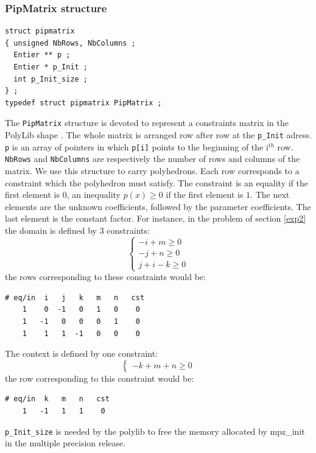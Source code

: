 \documentclass[12pt,a4paper]{article}
\begin{document}
\subsubsection{PipMatrix structure}
\begin{verbatim}
struct pipmatrix
{ unsigned NbRows, NbColumns ;
  Entier ** p ;
  Entier * p_Init ;
  int p_Init_size ;
} ;
typedef struct pipmatrix PipMatrix ;
\end{verbatim}
The {\tt PipMatrix} structure is devoted to represent a constraints matrix in the
PolyLib shape \cite{Wild:93}. The whole matrix is arranged row after row at the
{\tt p\_Init} adress. {\tt p} is an array of pointers in which
{\tt p[i]} points to the beginning of the i$^{th}$ row.
{\tt NbRows} and {\tt NbColumns} are respectively the number of
rows and columns of the matrix. We use this structure to carry polyhedrons.
Each row corresponds to a constraint which the polyhedron must satisfy. The
constraint is an equality if the first element is $0$, an inequality 
$p(x) \geq 0$ if the first element is $1$. The next elements are
the unknown coefficients, followed by the parameter coefficients.
The last element is the constant factor.
For instance, in the problem of section \ref{exp2} the domain is defined by 3
constraints:
\begin{displaymath}
\left\{
\begin{array}{l}
-i + m \geq 0\\
-j + n \geq 0\\
j + i - k \geq 0
\end{array}
\right.
\end{displaymath}
the rows corresponding to these constraints would be:
\begin{verbatim}
# eq/in  i   j   k   m   n   cst
    1    0  -1   0   1   0    0 
    1   -1   0   0   0   1    0 
    1    1   1  -1   0   0    0 
\end{verbatim}
The context is defined by one constraint:
\begin{displaymath}
\left\{
\begin{array}{l}
-k + m + n \geq 0
\end{array}
\right.
\end{displaymath}
the row corresponding to this constraint would be:
\begin{verbatim}
# eq/in  k   m   n   cst
    1   -1   1   1    0 
\end{verbatim}
{\tt p\_Init\_size} is needed by the polylib to free the memory allocated by
mpz\_init in the multiple precision release.
\end{document}
